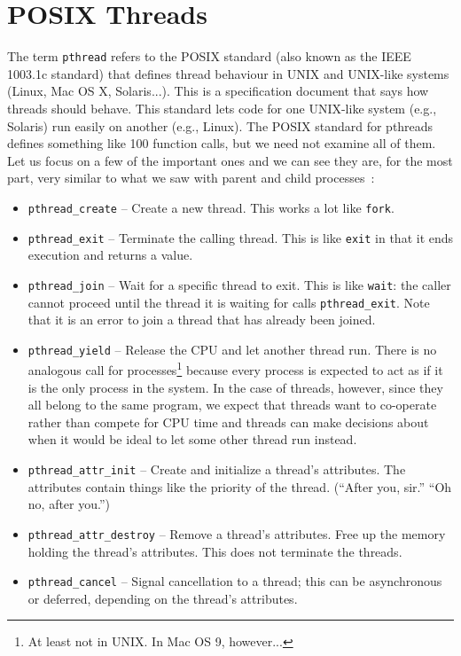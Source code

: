 




\section*{POSIX Threads}

The term \texttt{pthread} refers to the POSIX standard (also known as the IEEE 1003.1c standard) that defines thread behaviour in UNIX and UNIX-like systems (Linux, Mac OS X, Solaris...). This is a specification document that says how threads should behave. This standard lets code for one UNIX-like system (e.g., Solaris) run easily on another (e.g., Linux). The POSIX standard for pthreads defines something like 100 function calls, but we need not examine all of them. Let us focus on a few of the important ones and we can see they are, for the most part, very similar to what we saw with parent and child processes~\cite{mos}:

\begin{itemize}
	\item \texttt{pthread\_create} -- Create a new thread. This works a lot like \texttt{fork}.
	\item \texttt{pthread\_exit} -- Terminate the calling thread. This is like \texttt{exit} in that it ends execution and returns a value.
	\item \texttt{pthread\_join} -- Wait for a specific thread to exit. This is like \texttt{wait}: the caller cannot proceed until the thread it is waiting for calls \texttt{pthread\_exit}. Note that it is an error to join a thread that has already been joined.
	\item \texttt{pthread\_yield} -- Release the CPU and let another thread run. There is no analogous call for processes\footnote{At least not in UNIX. In Mac OS 9, however...} because every process is expected to act as if it is the only process in the system. In the case of threads, however, since they all belong to the same program, we expect that threads want to co-operate rather than compete for CPU time and threads can make decisions about when it would be ideal to let some other thread run instead.
	\item \texttt{pthread\_attr\_init} -- Create and initialize a thread's attributes. The attributes contain things like the priority of the thread. (``After you, sir.'' ``Oh no, after you.'')
	\item \texttt{pthread\_attr\_destroy} -- Remove a thread's attributes. Free up the memory holding the thread's attributes. This does not terminate the threads.
	\item \texttt{pthread\_cancel} -- Signal cancellation to a thread; this can be asynchronous or deferred, depending on the thread's attributes.
\end{itemize}


